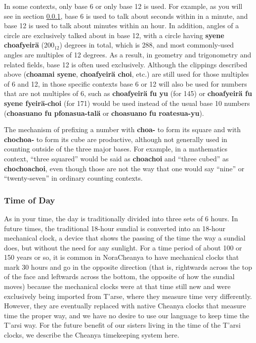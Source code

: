 \documentclass{article}
\begin{document}
In some contexts, only base 6 or only base 12 is used.  For example, as you will see in section \ref{time}, base 6 is used to talk about seconds within in a minute, and base 12 is used to talk about minutes within an hour.  In addition, angles of a circle are exclusively talked about in base 12, with a circle having \textbf{syene choafyeir\"a} (200$_{12}$) degrees in total, which is 288, and most commonly-used angles are multiples of 12 degrees.  As a result, in geometry and trigonometry and related fields, base 12 is often used exclusively.  Although the clippings described above (\textbf{choamai syene}, \textbf{choafyeir\"a choi}, etc.) are still used for those multiples of 6 and 12, in those specific contexts base 6 or 12 will also be used for numbers that are not multiples of 6, such as \textbf{choafyeir\"a fu yu} (for 145) or \textbf{choafyeir\"a fu syene fyeir\"a-choi} (for 171) would be used instead of the usual base 10 numbers (\textbf{choasuano fu pfonasua-tal\"a} or \textbf{choasuano fu roatesua-yu}).

The mechanism of prefixing a number with \textbf{choa-} to form its square and with \textbf{chochoa-} to form its cube are productive, although not generally used in counting outside of the three major bases.  For example, in a mathematics context, ``three squared'' would be said as \textbf{choachoi} and ``three cubed'' as \textbf{chochoachoi}, even though those are not the way that one would say ``nine'' or ``twenty-seven'' in ordinary counting contexts.

\subsubsection{Time of Day}
\label{time}

As in your time, the day is traditionally divided into three sets of 6 hours.  In future times, the traditional 18-hour sundial is converted into an 18-hour mechanical clock, a device that shows the passing of the time the way a sundial does, but without the need for any sunlight.  For a time period of about 100 or 150 years or so, it is common in NoraCheanya to have mechanical clocks that mark 30 hours and go in the opposite direction (that is, rightwards across the top of the face and leftwards across the bottom, the opposite of how the sundial moves) because the mechanical clocks were at that time still new and were exclusively being imported from T'arse, where they measure time very differently.  However, they are eventually replaced with native Cheanya clocks that measure time the proper way, and we have no desire to use our language to keep time the T'arsi way.  For the future benefit of our sisters living in the time of the T'arsi clocks, we describe the Cheanya timekeeping system here.
\end{document}
